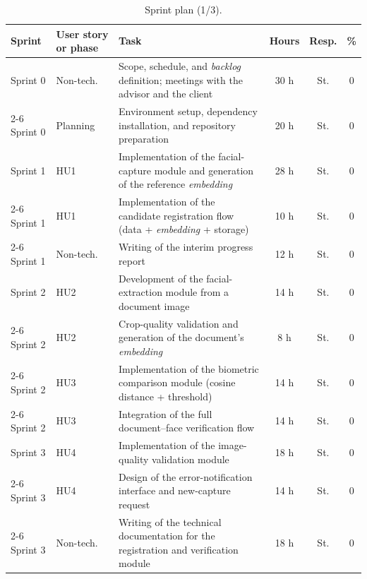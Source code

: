 \documentclass[
  11pt, %
]{charter}
\begin{document}
\begin{table}[htpb]
  \centering
  \caption{Sprint plan (1/3).}
  \begin{tabularx}{\linewidth}{@{}|l|X|X|c|c|c|@{}}
    \hline
    \rowcolor[HTML]{C0C0C0}
    Sprint & User story or phase & Task & Hours & Resp. & \% \\ \hline

    Sprint 0 & Non-tech. & Scope, schedule, and \textit{backlog} definition; meetings with the advisor and the client & 30 h & St. & 0 \\ \cline{2-6}
    Sprint 0 & Planning & Environment setup, dependency installation, and repository preparation & 20 h & St. & 0 \\ \hline

    Sprint 1 & HU1 & Implementation of the facial-capture module and generation of the reference \textit{embedding} & 28 h & St. & 0 \\ \cline{2-6}
    Sprint 1 & HU1 & Implementation of the candidate registration flow (data + \textit{embedding} + storage) & 10 h & St. & 0 \\ \cline{2-6}
    Sprint 1 & Non-tech. & Writing of the interim progress report & 12 h & St. & 0 \\ \hline

    Sprint 2 & HU2 & Development of the facial-extraction module from a document image & 14 h & St. & 0 \\ \cline{2-6}
    Sprint 2 & HU2 & Crop-quality validation and generation of the document's \textit{embedding} & 8 h & St. & 0 \\ \cline{2-6}
    Sprint 2 & HU3 & Implementation of the biometric comparison module (cosine distance + threshold) & 14 h & St. & 0 \\ \cline{2-6}
    Sprint 2 & HU3 & Integration of the full document--face verification flow & 14 h & St. & 0 \\ \hline

    Sprint 3 & HU4 & Implementation of the image-quality validation module & 18 h & St. & 0 \\ \cline{2-6}
    Sprint 3 & HU4 & Design of the error-notification interface and new-capture request & 14 h & St. & 0 \\ \cline{2-6}
    Sprint 3 & Non-tech. & Writing of the technical documentation for the registration and verification module & 18 h & St. & 0 \\ \hline

  \end{tabularx}
\end{table}
\end{document}
